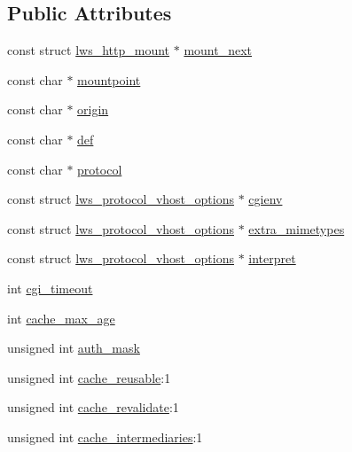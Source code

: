 \subsection*{Public Attributes}
\begin{DoxyCompactItemize}
\item 
const struct \hyperlink{structlws__http__mount}{lws\+\_\+http\+\_\+mount} $\ast$ \hyperlink{structlws__http__mount_aeb1b5e12e879ae64c14b30cffdf8d4e7}{mount\+\_\+next}
\item 
const char $\ast$ \hyperlink{structlws__http__mount_ac758fe692dce91b4232430caac7314c1}{mountpoint}
\item 
const char $\ast$ \hyperlink{structlws__http__mount_ada02a69fe663a4f6be10ac9925c8dd72}{origin}
\item 
const char $\ast$ \hyperlink{structlws__http__mount_adbe95138563f177bfe3dd8abb268c396}{def}
\item 
const char $\ast$ \hyperlink{structlws__http__mount_a5f32a7b69a080d9df9d96490523cf55d}{protocol}
\item 
const struct \hyperlink{structlws__protocol__vhost__options}{lws\+\_\+protocol\+\_\+vhost\+\_\+options} $\ast$ \hyperlink{structlws__http__mount_a54356a84ec5f290ac6e5b06ba6fce33f}{cgienv}
\item 
const struct \hyperlink{structlws__protocol__vhost__options}{lws\+\_\+protocol\+\_\+vhost\+\_\+options} $\ast$ \hyperlink{structlws__http__mount_a73455cf51d91943f6302c0993f66ddd8}{extra\+\_\+mimetypes}
\item 
const struct \hyperlink{structlws__protocol__vhost__options}{lws\+\_\+protocol\+\_\+vhost\+\_\+options} $\ast$ \hyperlink{structlws__http__mount_ac2244552114c206f814cb72a59fc302f}{interpret}
\item 
int \hyperlink{structlws__http__mount_a4a7239d6d4c03986e6e1a72abb6c83aa}{cgi\+\_\+timeout}
\item 
int \hyperlink{structlws__http__mount_a4283e30ea89d27ae7d061ad760d1d146}{cache\+\_\+max\+\_\+age}
\item 
unsigned int \hyperlink{structlws__http__mount_a614364c770b0bd4db464ad65cddab477}{auth\+\_\+mask}
\item 
unsigned int \hyperlink{structlws__http__mount_a8316dd183ffbef50419a5a4968d35d84}{cache\+\_\+reusable}\+:1
\item 
unsigned int \hyperlink{structlws__http__mount_ae137203040c6153694bd88a708da5395}{cache\+\_\+revalidate}\+:1
\item 
unsigned int \hyperlink{structlws__http__mount_aabec1a326780aafe11b977000983be0c}{cache\+\_\+intermediaries}\+:1

\end{DoxyCompactItemize}
